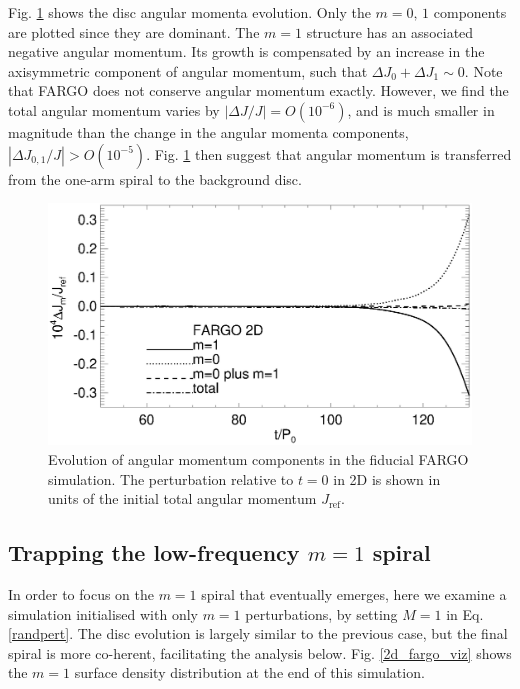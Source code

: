 Fig. \ref{2d_angmom} shows the disc angular momenta
evolution. Only the $m=0,\,1$ components are 
plotted since they are dominant. The $m=1$ structure has
an associated negative angular momentum.   
Its growth is compensated by an increase in the axisymmetric
component of angular momentum, such that $\Delta J_0 + \Delta
J_1 \sim 0$. Note that FARGO does not conserve angular momentum
exactly. However, we find the total angular momentum varies by 
$|\Delta J/J|= O(10^{-6})$, and is much smaller in magnitude than the
change in the angular momenta components, $|\Delta J_{0,1}/J|>
O(10^{-5})$. Fig. \ref{2d_angmom} then suggest that angular momentum
is transferred from the one-arm spiral to the background disc.    

\begin{figure}
  \includegraphics[width=\linewidth]{figures/nonaxi_evol_ang_fargo}
  \caption{Evolution of angular momentum components in the fiducial
    FARGO simulation. The perturbation
    relative to $t=0$ in 2D is shown in units of the
    initial total angular momentum $J_\mathrm{ref}$.\label{2d_angmom}} 
\end{figure}   

\subsection{Trapping the low-frequency $m=1$ spiral}\label{fargo_m1}
In order to focus on the $m=1$ spiral that eventually emerges, here 
we examine a simulation initialised with only $m=1$
perturbations, by setting $M=1$ in Eq. \ref{randpert}. The disc
evolution is largely similar to the previous case, but the final spiral is
more co-herent, facilitating the analysis below. 
Fig. \ref{2d_fargo_viz} shows the $m=1$ surface density
distribution at the end of this simulation.  

